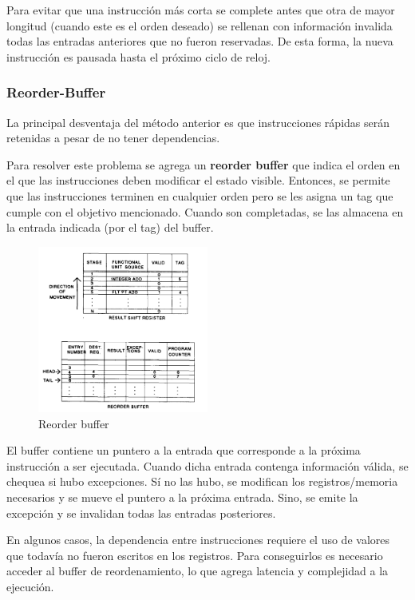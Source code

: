 Para evitar que una instrucción más corta se complete antes que otra de mayor longitud (cuando este es el orden deseado) se rellenan con información invalida todas las entradas anteriores que no fueron reservadas. De esta forma, la nueva instrucción es pausada hasta el próximo ciclo de reloj.

\subsubsection{Reorder-Buffer}
La principal desventaja del método anterior es que instrucciones rápidas serán retenidas a pesar de no tener dependencias.

Para resolver este problema se agrega un \textbf{reorder buffer} que indica el orden en el que las instrucciones deben modificar el estado visible. Entonces, se permite que las instrucciones terminen en cualquier orden pero se les asigna un tag que cumple con el objetivo mencionado. Cuando son completadas, se las almacena en la entrada indicada (por el tag) del buffer.

\begin{figure}[ht]
	\centering
	\includegraphics[width=0.5\textwidth]{imagenes/reorder-buffer}
	\caption{Reorder buffer}
	\label{fig:reorder-buffer}
\end{figure}

El buffer contiene un puntero a la entrada que corresponde a la próxima instrucción a ser ejecutada. Cuando dicha entrada contenga información válida, se  chequea si hubo excepciones. Sí no las hubo, se modifican los registros/memoria necesarios y se mueve el puntero a la próxima entrada. Sino, se emite la excepción y se invalidan todas las entradas posteriores.

En algunos casos, la dependencia entre instrucciones requiere el uso de valores que todavía no fueron escritos en los registros. Para conseguirlos es necesario acceder al buffer de reordenamiento, lo que agrega latencia y complejidad a la ejecución.

